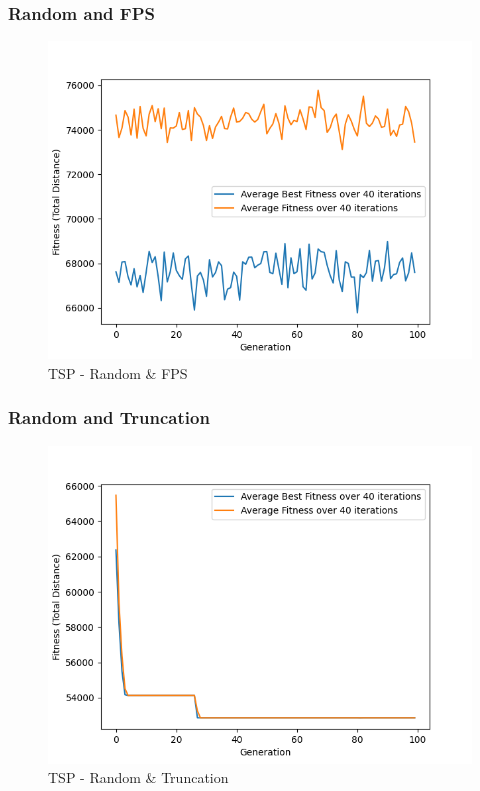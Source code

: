 \documentclass[11pt, letterpaper]{article}
\begin{document}
\subsubsection {Random and FPS}
\begin{figure}[H]
    \centering
    \includegraphics[scale = 0.6]{images/tsp_rd_fp.png}
    \caption {TSP - Random \& FPS}
    \label {fig:tpsRB}
\end{figure}

\subsubsection {Random and Truncation}
\begin{figure}[H]
    \centering
    \includegraphics[scale = 0.6]{images/tsp_rd_tr.png}
    \caption {TSP - Random \& Truncation}
    \label {fig:tpsRT}
\end{figure}
\end{document}
